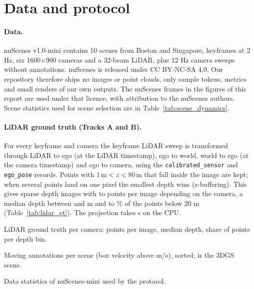 \documentclass[10pt]{article}
\begin{document}
\section{Data and protocol}
\label{sec:protocol}

\paragraph{Data.}
nuScenes v1.0-mini \citep{caesar2020nuscenes} contains 10 scenes from Boston and Singapore,
\GTkeyframes{} keyframes at 2 Hz, six 1600$\times$900 cameras and a 32-beam LiDAR, plus 12 Hz camera
sweeps without annotations. nuScenes is released under CC BY-NC-SA 4.0. Our repository therefore ships no
images or point clouds, only sample tokens, metrics and small renders of our own outputs. The nuScenes
frames in the figures of this report are used under that licence, with attribution to the nuScenes authors.
Scene statistics used for scene selection are in Table~\ref{tab:scene_dynamics}.

\paragraph{LiDAR ground truth (Tracks A and B).}
For every keyframe and camera the keyframe LiDAR sweep is transformed through LiDAR to ego (at the LiDAR
timestamp), ego to world, world to ego (at the camera timestamp) and ego to camera, using the
\texttt{calibrated\_sensor} and \texttt{ego\_pose} records. Points with $1\,\mathrm{m} < z < 80\,\mathrm{m}$
that fall inside the image are kept; when several points land on one pixel the smallest depth wins
(z-buffering). This gives \GTimages{} sparse depth images with \GTptsMin{} to \GTptsMax{} points per image
depending on the camera, a median depth between \GTmedianZmin{} and \GTmedianZmax{} m and
\GTfracNearMin{} to \GTfracNearMax\% of the points below 20 m (Table~\ref{tab:lidar_gt}). The projection
takes \GTwallSeconds{} s on the CPU.

\begin{table}[t]
\centering
\begin{subtable}[t]{0.56\textwidth}
\centering
{}
\caption{LiDAR ground truth per camera: points per image, median depth, share of points per depth bin.}
\label{tab:lidar_gt}
\end{subtable}\hfill
\begin{subtable}[t]{0.41\textwidth}
\centering
{}
\caption{Moving annotations per scene (box velocity above \DynVelThreshold{} m/s), sorted; \GSscene{} is the 3DGS scene.}
\label{tab:scene_dynamics}
\end{subtable}
\caption{Data statistics of nuScenes-mini used by the protocol.}
\label{tab:data}
\end{table}
\end{document}
